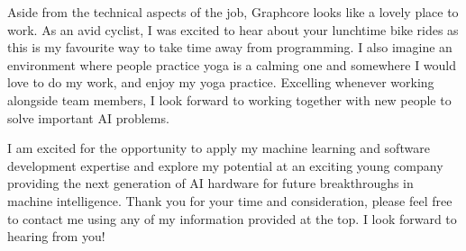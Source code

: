 \documentclass[11pt, a4paper]{cv}
\begin{document}
\begin{cvletter}
Aside from the technical aspects of the job, Graphcore looks like a lovely place to work. As an avid cyclist, I was excited to hear about your lunchtime bike rides as this is my favourite way to take time away from programming. I also imagine an environment where people practice yoga is a calming one and somewhere I would love to do my work, and enjoy my yoga practice. Excelling whenever working alongside team members, I look forward to working together with new people to solve important AI problems.

I am excited for the opportunity to apply my machine learning and software development expertise and explore my potential at an exciting young company providing the next generation of AI hardware for future breakthroughs in machine intelligence. Thank you for your time and consideration, please feel free to contact me using any of my information provided at the top. I look forward to hearing from you!


\end{cvletter}

\makeletterclosing
\end{document}
